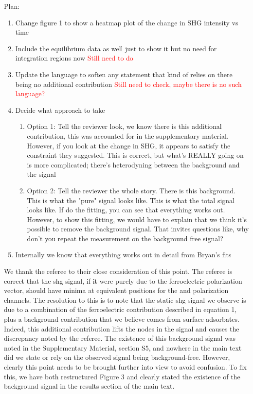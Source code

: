 
Plan:
\begin{enumerate}
\item Change figure 1 to show a heatmap plot of the change in SHG intensity vs time
\item Include the equilibrium data as well just to show it but no need for integration regions now \textcolor{red}{Still need to do}
\item Update the language to soften any statement that kind of relies on there being no additional contribution \textcolor{red}{Still need to check, maybe there is no such language?}
\item Decide what approach to take
\begin{enumerate}
\item Option 1: Tell the reviewer look, we know there is this additional contribution, this was accounted for in the supplementary material. However, if you look at the change in SHG, it appears to satisfy the constraint they suggested. This is correct, but what's REALLY going on is more complicated; there's heterodyning between the background and the signal
\item Option 2: Tell the reviewer the whole story. There is this background. This is what the "pure" signal looks like. This is what the total signal looks like. If do the fitting, you can see that everything works out. However, to show this fitting, we would have to explain that we think it's possible to remove the background signal. That invites questions like, why don't you repeat the measurement on the background free signal?
\end{enumerate}
\item Internally we know that everything works out in detail from Bryan's fits
\end{enumerate}

We thank the referee to their close consideration of this point.
The referee is correct that the \gls{shg} signal, if it were purely due to the ferroelectric polarization vector, should have minima at equivalent positions for the \PS and \SS polarization channels.
The resolution to this is to note that the static \gls{shg} signal we observe is due to a combination of the ferroelectric contribution described in equation 1, plus a background contribution that we believe comes from surface adsorbates.
Indeed, this additional contribution lifts the nodes in the \SS signal and causes the discrepancy noted by the referee.
The existence of this background signal was noted in the Supplementary Material, section S5, and nowhere in the main text did we state or rely on the observed signal being background-free.
However, clearly this point needs to be brought further into view to avoid confusion.
To fix this, we have both restructured Figure 3 and clearly stated the existence of the background signal in the results section of the main text.

